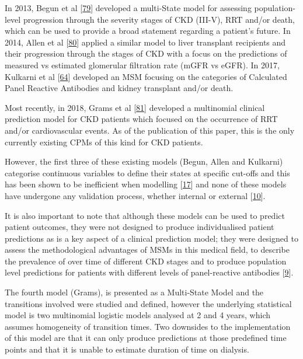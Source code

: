 \documentclass[12pt,PhD,twoside,openright]{muthesis}
\begin{document}
In 2013, Begun et al {[}\protect\hyperlink{ref-begun_identification_2013}{79}{]} developed a multi-State model for assessing population-level progression through the severity stages of CKD (III-V), RRT and/or death, which can be used to provide a broad statement regarding a patient's future. In 2014, Allen et al {[}\protect\hyperlink{ref-allen_chronic_2014}{80}{]} applied a similar model to liver transplant recipients and their progression through the stages of CKD with a focus on the predictions of measured vs estimated glomerular filtration rate (mGFR vs eGFR). In 2017, Kulkarni et al {[}\protect\hyperlink{ref-kulkarni_transition_2017}{64}{]} developed an MSM focusing on the categories of Calculated Panel Reactive Antibodies and kidney transplant and/or death.

Most recently, in 2018, Grams et al {[}\protect\hyperlink{ref-grams_predicting_2018}{81}{]} developed a multinomial clinical prediction model for CKD patients which focused on the occurrence of RRT and/or cardiovascular events. As of the publication of this paper, this is the only currently existing CPMs of this kind for CKD patients.

However, the first three of these existing models (Begun, Allen and Kulkarni) categorise continuous variables to define their states at specific cut-offs and this has been shown to be inefficient when modelling {[}\protect\hyperlink{ref-royston_dichotomizing_2006}{17}{]} and none of these models have undergone any validation process, whether internal or external {[}\protect\hyperlink{ref-altman_prognosis_2009}{10}{]}.

It is also important to note that although these models can be used to predict patient outcomes, they were not designed to produce individualised patient predictions as is a key aspect of a clinical prediction model; they were designed to assess the methodological advantages of MSMs in this medical field, to describe the prevalence of over time of different CKD stages and to produce population level predictions for patients with different levels of panel-reactive antibodies {[}\protect\hyperlink{ref-royston_prognosis_2009}{9}{]}.

The fourth model (Grams), is presented as a Multi-State Model and the transitions involved were studied and defined, however the underlying statistical model is two multinomial logistic models analysed at 2 and 4 years, which assumes homogeneity of transition times. Two downsides to the implementation of this model are that it can only produce predictions at those predefined time points and that it is unable to estimate duration of time on dialysis.
\end{document}
